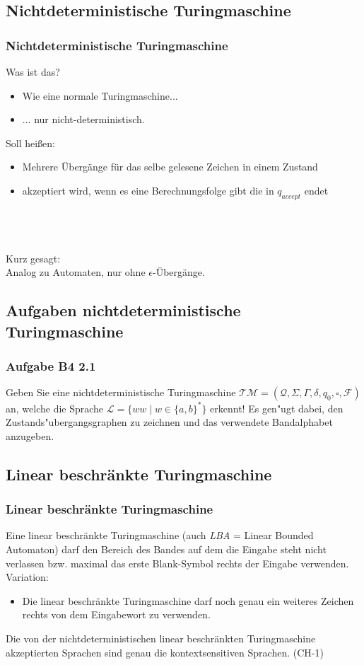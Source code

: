 \subsection{Nichtdeterministische Turingmaschine}
\begin{frame}
	\frametitle{Nichtdeterministische Turingmaschine}
	Was ist das?
	\begin{itemize}
		\item Wie eine normale Turingmaschine...
		\item ... nur nicht-deterministisch.
	\end{itemize}
	Soll heißen:
	\begin{itemize}
		\item Mehrere Übergänge für das selbe gelesene Zeichen in einem Zustand
		\item akzeptiert wird, wenn es eine Berechnungsfolge gibt die in $q_{accept}$ endet
	\end{itemize}
	~\\~\\~\\
	Kurz gesagt:~\\
	Analog zu Automaten, nur ohne $\epsilon$-Übergänge.
\end{frame}

\subsection{Aufgaben nichtdeterministische Turingmaschine}
\begin{frame}
\frametitle{Aufgabe B4 2.1}
Geben Sie eine nichtdeterministische Turingmaschine $\mathcal{TM} =
(\mathcal{Q},\Sigma,\Gamma,\delta,q_0,\square,\mathcal{F})$ an, welche die Sprache
$\mathcal{L} = \{ww \; | \; w \in \{a,b\}^*\}$ erkennt! Es gen"ugt dabei, den
Zustands"ubergangsgraphen zu zeichnen und das verwendete Bandalphabet anzugeben.
\end{frame}

\subsection{Linear beschränkte Turingmaschine}
\begin{frame}
	\frametitle{Linear beschränkte Turingmaschine}
	Eine linear beschränkte Turingmaschine (auch \emph{LBA} = Linear Bounded Automaton) darf den Bereich des Bandes auf dem die Eingabe steht nicht verlassen bzw. maximal das erste Blank-Symbol rechts der Eingabe verwenden.\\
	\vspace{2mm}
	Variation:
	\begin{itemize}
		\item Die linear beschränkte Turingmaschine darf noch genau ein weiteres Zeichen rechts von dem Eingabewort zu verwenden. 
	\end{itemize}
	\vspace{2mm}
	Die von der nichtdeterministischen linear beschränkten Turingmaschine akzeptierten Sprachen sind genau die kontextsensitiven Sprachen. (CH-1)
\end{frame}

